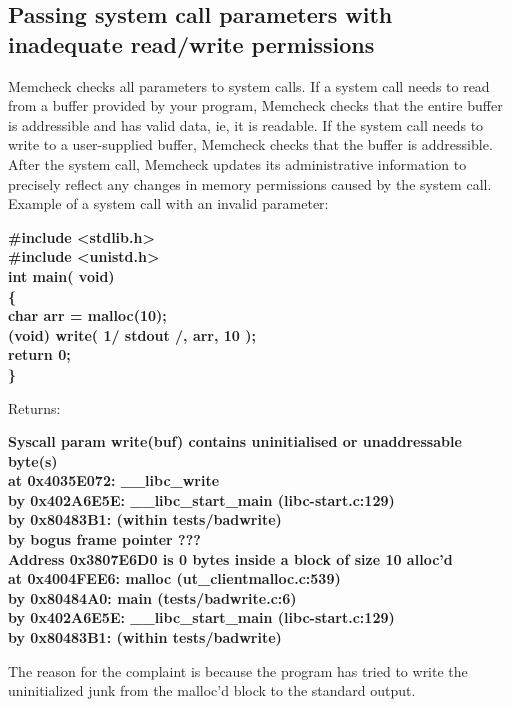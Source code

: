 \documentclass{article}
\begin{document}
\subsection{Passing system call parameters with inadequate read/write permissions}
Memcheck checks all parameters to system calls.
If a system call needs to read from a buffer provided by your program, Memcheck checks that the entire buffer is addressible and has valid data, ie, it is readable.
If the system call needs to write to a user-supplied buffer, Memcheck checks that the buffer is addressible. 
After the system call, Memcheck updates its administrative information to precisely reflect any changes in memory permissions caused by the system call.
Example of a system call with an invalid parameter:
\begin{flushleft}
\textbf{\#include \textless stdlib.h\textgreater}\\
\textbf{\#include \textless unistd.h\textgreater}\\
\textbf{int main( void)}\\
\textbf{\{}\\
\textbf{\hspace{10} char\* arr = malloc(10);}\\
\textbf{\hspace{10} (void) write( 1/\* stdout \*/, arr, 10 );}\\
\textbf{\hspace{10} return 0;}\\
\textbf{\}}\\
\end{flushleft}
Returns:
\begin{flushleft}
\textbf{Syscall param write(buf) contains uninitialised or unaddressable byte(s)}\\
\textbf{\hspace{15} at 0x4035E072: \_\_libc\_write}\\
\textbf{\hspace{15} by 0x402A6E5E: \_\_libc\_start\_main (libc-start.c:129)}\\
\textbf{\hspace{15} by 0x80483B1: (within tests/badwrite)}\\
\textbf{\hspace{15} by \<bogus frame pointer\> ???}\\
\textbf{\hspace{15} Address 0x3807E6D0 is 0 bytes inside a block of size 10 alloc’d}\\
\textbf{\hspace{15} at 0x4004FEE6: malloc (ut\_clientmalloc.c:539)}\\
\textbf{\hspace{15} by 0x80484A0: main (tests/badwrite.c:6)}\\
\textbf{\hspace{15} by 0x402A6E5E: \_\_libc\_start\_main (libc-start.c:129)}\\
\textbf{\hspace{15} by 0x80483B1: (within tests/badwrite)}\\
\end{flushleft}
The reason for the complaint is because the program has tried to write the uninitialized junk from the malloc'd block to the standard output.
\end{document}
